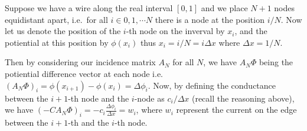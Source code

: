 \documentclass[]{article}
\begin{document}
Suppose we have a wire along the real interval \([0, 1]\) and we place
\(N + 1\) nodes equidistant apart, i.e.~for all
\(i \in {0, 1, \cdots N}\) there is a node at the position \(i / N\).
Now let us denote the position of the \(i\)-th node on the inverval by
\(x_i\), and the potiential at this position by \(\phi(x_i)\) thus
\(x_i = i / N = i \Delta x\) where \(\Delta x = 1 / N\).

Then by considering our incidence matrix \(A_N\) for all \(N\), we have
\(A_N \Phi\) being the potiential difference vector at each node i.e.
\((A_N \Phi)_i = \phi(x_{i+1}) - \phi(x_i) = \Delta \phi_i\). Now, by
defining the conductance between the \(i+1\)-th node and the \(i\)-node
as \(c_i / \Delta x\) (recall the reasoning above), we have
\((-CA_N \Phi)_i = -c_i \frac{\Delta \phi_i}{\Delta x} = w_i\), where
\(w_i\) represent the current on the edge between the \(i+1\)-th and the
\(i\)-th node.
\end{document}
